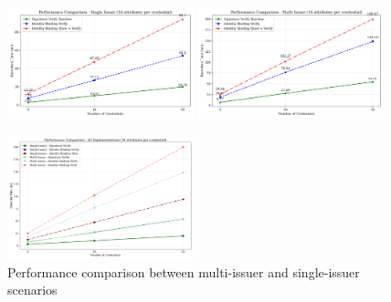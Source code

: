 \begin{figure}
    \centering
    \begin{minipage}{\textwidth}
        \centering
        \includegraphics[width=0.48\textwidth]{figures/identity_binding_single_issuer_performance.png}
        \hfill
        \includegraphics[width=0.48\textwidth]{figures/identity_binding_multi_issuer_performance.png}
    \end{minipage}
    
    \vspace{1em} %
    
    \begin{minipage}{\textwidth}
        \centering
        \includegraphics[width=0.48\textwidth]{figures/identity_binding_combined_performance.png}
    \end{minipage}
    
    \caption{Performance comparison between multi-issuer and single-issuer scenarios}
    \label{fig:performance-comparison}
\end{figure}

\clearpage
































